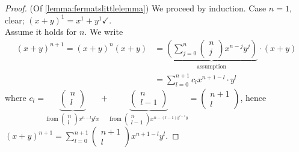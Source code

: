 \documentclass[12pt,oneside]{article}
\begin{document}
\begin{proof}(Of \cref{lemma:fermatslittlelemma})
  We proceed by induction. Case $n= 1$, clear; $(x+y)^1 = x^1 + y^1 \checkmark$.\\
  Assume it holds for $n$. We write \begin{align*}
    (x+y)^{n+1} = (x+y)^{n}(x+y) &= \underbrace{\left(\sum_{j=0}^n \begin{pmatrix}
      n\\j
    \end{pmatrix}x^{n-j}y^j\right)}_{\text{assumption}}\cdot(x+y)\\
    &= \sum_{l=0}^{n+1} c_l x^{n+1 - l} \cdot y^l
  \end{align*}
  where $c_l = \underbrace{\begin{pmatrix}
    n\\l
  \end{pmatrix}}_{\text{from } \begin{pmatrix}
  n\\l
  \end{pmatrix}x^{n-l}y^lx} + \underbrace{\begin{pmatrix}
    n\\l-1
  \end{pmatrix}}_{\text{from } \begin{pmatrix}
  n\\l-1
  \end{pmatrix}x^{n-(l-1)y^{l-1}y}} = \begin{pmatrix}
    n+1\\l
  \end{pmatrix}$, hence $(x+y)^{n+1} = \sum_{l=0}^{n+1} \begin{pmatrix}
    n+1\\l
  \end{pmatrix} x^{n+1-l}y^{l}$.
\end{proof}
\end{document}
